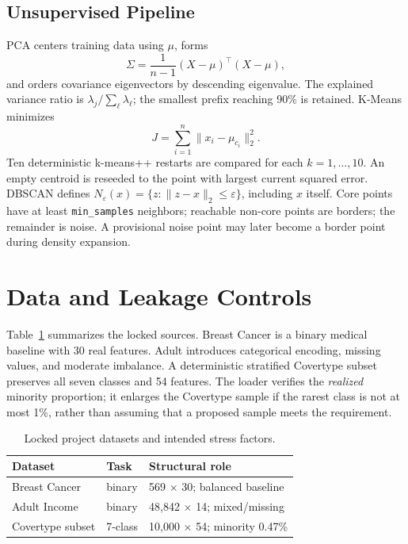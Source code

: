 \documentclass[conference]{IEEEtran}
\begin{document}
\subsection{Unsupervised Pipeline}
PCA centers training data using $\mu$, forms
\begin{equation}
\Sigma=\frac{1}{n-1}(X-\mu)^\top(X-\mu), \label{eq:cov}
\end{equation}
and orders covariance eigenvectors by descending eigenvalue. The explained
variance ratio is $\lambda_j/\sum_\ell\lambda_\ell$; the smallest prefix
reaching 90\% is retained. K-Means minimizes
\begin{equation}
J=\sum_{i=1}^{n}\|x_i-\mu_{c_i}\|_2^2. \label{eq:kmeans}
\end{equation}
Ten deterministic k-means++ restarts are compared for each $k=1,\ldots,10$.
An empty centroid is reseeded to the point with largest current squared error.
DBSCAN defines $N_\varepsilon(x)=\{z:\|z-x\|_2\leq\varepsilon\}$, including
$x$ itself. Core points have at least \texttt{min\_samples} neighbors; reachable
non-core points are borders; the remainder is noise. A provisional noise point
may later become a border point during density expansion.

\section{Data and Leakage Controls}
Table~\ref{tab:data} summarizes the locked sources. Breast Cancer is a binary
medical baseline with 30 real features. Adult introduces categorical encoding,
missing values, and moderate imbalance. A deterministic stratified Covertype
subset preserves all seven classes and 54 features. The loader verifies the
\emph{realized} minority proportion; it enlarges the Covertype sample if the
rarest class is not at most 1\%, rather than assuming that a proposed sample
meets the requirement.

\begin{table}[t]
\caption{Locked project datasets and intended stress factors.}
\label{tab:data}
\centering
\begin{tabular}{lll}
\toprule
Dataset & Task & Structural role \\
\midrule
Breast Cancer & binary & 569 $\times$ 30; balanced baseline \\
Adult Income & binary & 48,842 $\times$ 14; mixed/missing \\
Covertype subset & 7-class & 10,000 $\times$ 54; minority 0.47\% \\
\bottomrule
\end{tabular}
\end{table}
\end{document}
